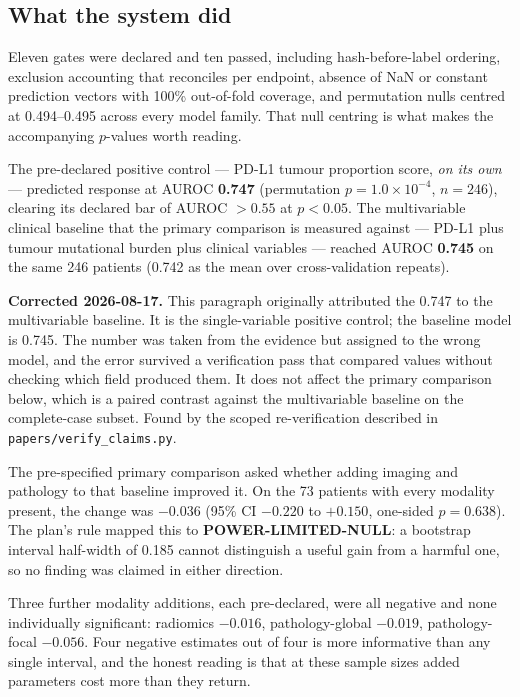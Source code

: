 \documentclass[11pt,a4paper]{article}
\begin{document}
\subsection{What the system did}

Eleven gates were declared and ten passed, including hash-before-label ordering, exclusion
accounting that reconciles per endpoint, absence of NaN or constant prediction vectors with 100\%
out-of-fold coverage, and permutation nulls centred at 0.494--0.495 across every model family.
That null centring is what makes the accompanying $p$-values worth reading.

The pre-declared positive control --- PD-L1 tumour proportion score, \emph{on its own} ---
predicted response at AUROC \textbf{0.747} (permutation $p = 1.0\times10^{-4}$, $n = 246$),
clearing its declared bar of AUROC $>0.55$ at $p<0.05$. The multivariable clinical baseline that
the primary comparison is measured against --- PD-L1 plus tumour mutational burden plus clinical
variables --- reached AUROC \textbf{0.745} on the same 246 patients (0.742 as the mean over
cross-validation repeats).

\textcolor{qred}{\textbf{Corrected 2026-08-17.}} This paragraph originally attributed the 0.747 to
the multivariable baseline. It is the single-variable positive control; the baseline model is
0.745. The number was taken from the evidence but assigned to the wrong model, and the error
survived a verification pass that compared values without checking which field produced them. It
does not affect the primary comparison below, which is a paired contrast against the multivariable
baseline on the complete-case subset. Found by the scoped re-verification described in
\texttt{papers/verify\_claims.py}.

The pre-specified primary comparison asked whether adding imaging and pathology to that baseline
improved it. On the 73 patients with every modality present, the change was $-0.036$
(95\% CI $-0.220$ to $+0.150$, one-sided $p = 0.638$). The plan's rule mapped this to
\textbf{POWER-LIMITED-NULL}: a bootstrap interval half-width of 0.185 cannot distinguish a useful
gain from a harmful one, so no finding was claimed in either direction.

Three further modality additions, each pre-declared, were all negative and none individually
significant: radiomics $-0.016$, pathology-global $-0.019$, pathology-focal $-0.056$. Four
negative estimates out of four is more informative than any single interval, and the honest
reading is that at these sample sizes added parameters cost more than they return.
\end{document}
